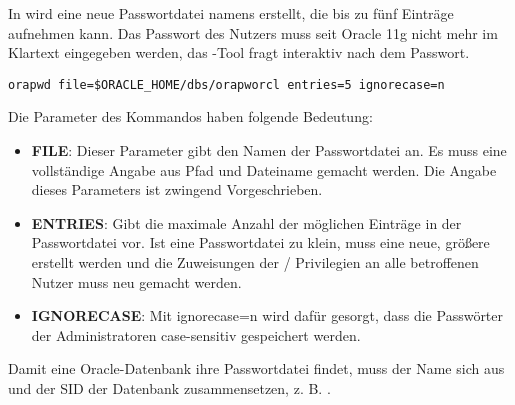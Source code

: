           In  wird eine neue Passwortdatei namens  erstellt, die bis zu f\"unf Eintr\"age aufnehmen kann. Das Passwort des Nutzers  muss seit Oracle 11g nicht mehr im Klartext eingegeben werden, das -Tool fragt interaktiv nach dem Passwort.
          \begin{lstlisting}[caption={Erstellen einer Passwortdatei mit
          ORAPWD},label=admin210,language=terminal]
orapwd file=$ORACLE_HOME/dbs/orapworcl entries=5 ignorecase=n
          \end{lstlisting}
          Die Parameter des Kommandos  haben folgende Bedeutung:
          \begin{itemize}
            \item \textbf{FILE}: Dieser Parameter gibt den Namen der
            Passwortdatei an. Es muss eine voll\-st\"an\-dige Angabe aus Pfad
            und Dateiname gemacht werden. Die Angabe dieses Parameters ist
            zwingend Vorgeschrieben.
            \item \textbf{ENTRIES}: Gibt die maximale Anzahl der m\"oglichen
            Eintr\"age in der Passwortdatei vor. Ist eine            
            Passwortdatei zu klein, muss eine neue, gr\"o\ss ere erstellt werden
            und die Zuweisungen der /
            Privilegien an alle betroffenen Nutzer muss neu gemacht werden.
            \item \textbf{IGNORECASE}: Mit ignorecase=n wird daf\"ur gesorgt, dass die Passw\"orter der Administratoren case-sensitiv gespeichert werden.
          \end{itemize}
          \begin{merke}
            Damit eine Oracle-Datenbank ihre Passwortdatei findet, muss der Name sich aus  und der SID der Datenbank zusammensetzen, z. B. .
          \end{merke}
